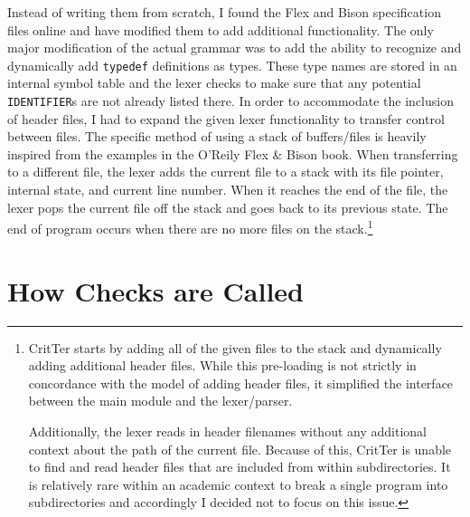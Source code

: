 \documentclass[12pt]{report}
\newcommand{\programName}{CritTer\xspace}
\begin{document}
Instead of writing them from scratch, I found the Flex and Bison specification files 
online\cite{originalGrammar} and have modified them to add additional functionality. The only major 
modification of the actual grammar was to add the ability to recognize and dynamically add 
\lstinline{typedef} definitions as types. These type names are stored in an internal symbol table and the 
lexer checks to make sure that any potential \lstinline{IDENTIFIER}s are not already listed there. In 
order to accommodate the inclusion of header files, I had to expand the given lexer functionality to 
transfer control between files. The specific method of using a stack of buffers\slash files is heavily 
inspired from the examples in the O'Reily Flex \& Bison book\cite{flex-and-bison}. When transferring to a 
different file, the lexer adds the current file to a stack with its file pointer, internal state, and current line 
number. When it reaches the end of the file, the lexer pops the current file off the stack and goes back 
to its previous state. The end of program occurs when there are no more files on the 
stack.\footnote{\programName starts by adding all of the given files to the stack and dynamically adding 
additional header files. While this pre-loading is not strictly in concordance with the model of adding 
header files, it simplified the interface between the main module and the lexer\slash parser.

Additionally, the lexer reads in header filenames without any additional context about the path of the 
current file. Because of this, \programName is unable to find and read header files that are included from 
within subdirectories. It is relatively rare within an academic context to break a single program into 
subdirectories and accordingly I decided not to focus on this issue.} 

\section{How Checks are Called}
\label{howChecksAreCalled}
\end{document}
